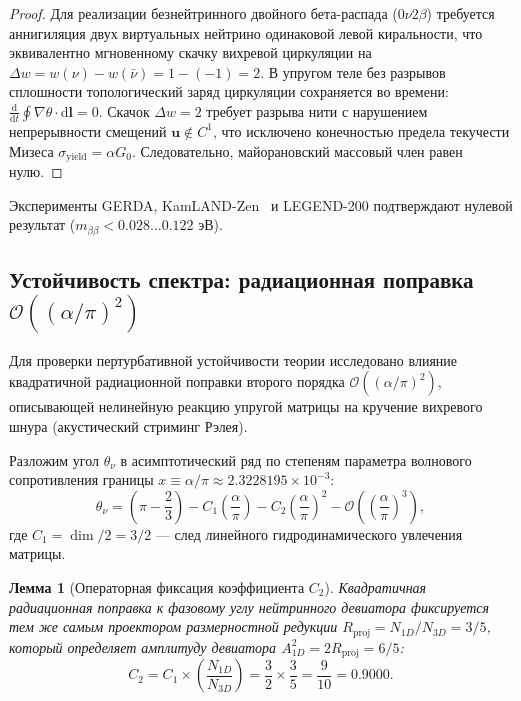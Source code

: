 \documentclass[11pt,a4paper]{article}
\newtheorem{lemma}[theorem]{Лемма}
\theoremstyle{definition}
\theoremstyle{remark}
\begin{document}
\begin{proof}
Для реализации безнейтринного двойного бета-распада ($0\nu 2\beta$) требуется аннигиляция двух виртуальных нейтрино одинаковой левой киральности, что эквивалентно мгновенному скачку вихревой циркуляции на $\Delta w = w(\nu) - w(\bar{\nu}) = 1 - (-1) = 2$. В упругом теле без разрывов сплошности топологический заряд циркуляции сохраняется во времени: $\frac{\mathrm{d}}{\mathrm{d}t} \oint \nabla\theta \cdot \mathrm{d}\mathbf{l} = 0$. Скачок $\Delta w = 2$ требует разрыва нити с нарушением непрерывности смещений $\mathbf{u} \notin C^1$, что исключено конечностью предела текучести Мизеса $\sigma_{\mathrm{yield}} = \alpha G_0$. Следовательно, майорановский массовый член равен нулю.
\end{proof}
Эксперименты GERDA, KamLAND-Zen~\cite{KamLANDZen2025} и LEGEND-200 подтверждают нулевой результат ($m_{\beta\beta} < 0.028\dots 0.122\text{ эВ}$).
	
\subsection{Устойчивость спектра: радиационная поправка $\mathcal{O}((\alpha/\pi)^2)$}
	
Для проверки пертурбативной устойчивости теории исследовано влияние квадратичной радиационной поправки второго порядка $\mathcal{O}((\alpha/\pi)^2)$, описывающей нелинейную реакцию упругой матрицы на кручение вихревого шнура (акустический стриминг Рэлея).
	
Разложим угол $\theta_\nu$ в асимптотический ряд по степеням параметра волнового сопротивления границы $x \equiv \alpha/\pi \approx 2.3228195 \times 10^{-3}$:
\begin{equation}
\theta_\nu = \left(\pi - \frac{2}{3}\right) - C_1 \left(\frac{\alpha}{\pi}\right) - C_2 \left(\frac{\alpha}{\pi}\right)^2 - \mathcal{O}\left(\left(\frac{\alpha}{\pi}\right)^3\right),
\label{eq:theta_nu_expansion_chapter}
\end{equation}
где $C_1 = \dim/2 = 3/2$ — след линейного гидродинамического увлечения матрицы. 
	
\begin{lemma}[Операторная фиксация коэффициента $C_2$]
\label{lem:neutrino_c2_operator}
Квадратичная радиационная поправка к фазовому углу нейтринного девиатора фиксируется тем же самым проектором размерностной редукции $R_{\mathrm{proj}} = N_{1D}/N_{3D} = 3/5$, который определяет амплитуду девиатора $A_{1D}^2 = 2 R_{\mathrm{proj}} = 6/5$:
\begin{equation}
C_2 = C_1 \times \left(\frac{N_{1D}}{N_{3D}}\right) = \frac{3}{2} \times \frac{3}{5} = \frac{9}{10} = 0.9000.
\label{eq:C2_operator_exact}
\end{equation}
\end{lemma}
	
\end{document}
